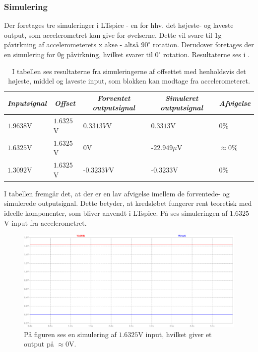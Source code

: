 \subsubsection{Simulering}
Der foretages tre simuleringer i LTspice - en for hhv. det højeste- og laveste output, som accelerometret kan give for øvelserne. Dette vil svare til 1g påvirkning af accelerometerets x akse - altså $90^{\circ}$ rotation. Derudover foretages der en simulering for 0g påvirkning, hvilket svarer til $0^{\circ}$ rotation. Resultaterne ses i .
\begin{table}[H]
	\centering
	\begin{tabular}{|l|l|l|l|l|}
		\hline
		\multicolumn{1}{|c|}{\textit{Inputsignal}} & \multicolumn{1}{c|}{\textit{Offset}} & \multicolumn{1}{c|}{\textit{Forventet outputsignal}} & \multicolumn{1}{c|}{\textit{Simuleret outputsignal}} & \multicolumn{1}{c|}{\textit{Afvigelse}} \\ \hline
		$1.9638$V     & $1.6325$V    & $0.3313V$V    & $0.3313$V       & $0$\%              \\ \hline
		$1.6325$V     & $1.6325$V    & $0$V          & -$22.949\mu$V   & $\approx 0$\%      \\ \hline
		$1.3092$V     & $1.6325$V    & -$0.3233V$V   & -$0.3233$V      & $0$\%                \\ \hline
	\end{tabular}
	\caption{I tabellen ses resultaterne fra simuleringerne af offsettet med henholdsvis det højeste, middel og laveste input, som blokken kan modtage fra accelerometeret.}
	\label{Tab:offset_sim}
\end{table}
\noindent I tabellen fremgår det, at der er en lav afvigelse imellem de forventede- og simulerede outputsignal. Dette betyder, at kredsløbet fungerer rent teoretisk med ideelle komponenter, som bliver anvendt i LTspice. På  ses simuleringen af $1.6325$V input fra accelerometret.
 
\begin{figure}[H]
\centering
\includegraphics[scale=0.3]{figures/cProblemloesning/Offset_simulering.png}
\caption{På figuren ses en simulering af $1.6325$V input, hvilket giver et output på $\approx 0$V.}
\label{fig:Offset_simulering}
\end{figure}

